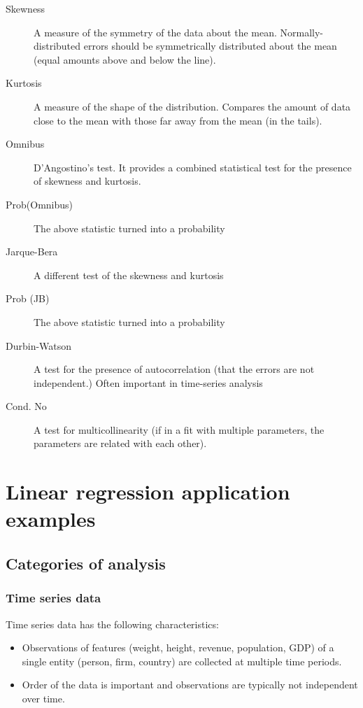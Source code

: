 \begin{refsection}
\begin{description}
	\item[Skewness]	A measure of the symmetry of the data about the mean. Normally-distributed errors should be symmetrically distributed about the mean (equal amounts above and below the line).
	\item[Kurtosis]	A measure of the shape of the distribution. Compares the amount of data close to the mean with those far away from the mean (in the tails).
	\item[Omnibus]	D'Angostino's test. It provides a combined statistical test for the presence of skewness and kurtosis.
	\item[Prob(Omnibus)]	The above statistic turned into a probability
	\item[Jarque-Bera]	A different test of the skewness and kurtosis
	\item[Prob (JB)]	The above statistic turned into a probability
	\item[Durbin-Watson]	A test for the presence of autocorrelation (that the errors are not independent.) Often important in time-series analysis
	\item[Cond. No]	A test for multicollinearity (if in a fit with multiple parameters, the parameters are related with each other).
\end{description}


\section{Linear regression application examples}


\subsection{Categories of analysis}
\subsubsection{Time series data}

\begin{definition}
Time series data has the following characteristics:
\begin{itemize}
	\item Observations of features (weight, height, revenue, population, GDP) of a single entity (person, firm, country) are collected at multiple time periods.
	\item Order of the data is important and observations are typically not independent over time.
\end{itemize}		
\end{definition}



\end{refsection}
